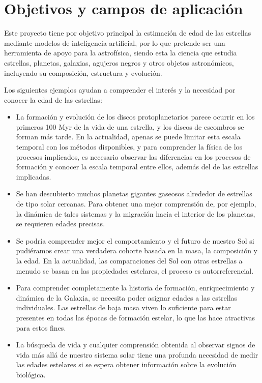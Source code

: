 \documentclass[12pt,oneside,a4paper]{article}
\begin{document}
\section{Objetivos y campos de aplicación}
Este proyecto tiene por objetivo principal la estimación de edad de las estrellas mediante modelos de inteligencia artificial, por lo que pretende ser una herramienta de apoyo para la astrofísica, siendo esta la ciencia que estudia estrellas, planetas, galaxias, agujeros negros y otros objetos astronómicos, incluyendo su composición, estructura y evolución.

Los siguientes ejemplos ayudan a comprender el interés y la necesidad por conocer la edad de las estrellas:
\begin{itemize}
\item La formación y evolución de los discos protoplanetarios parece ocurrir en los primeros 100 Myr de la vida de una estrella, y los discos de escombros se forman más tarde. En la actualidad, apenas se puede limitar esta escala temporal con los métodos disponibles, y para comprender la física de los procesos implicados, es necesario observar las diferencias en los procesos de formación y conocer la escala temporal entre ellos, además del de las estrellas implicadas.
\item Se han descubierto muchos planetas gigantes gaseosos alrededor de estrellas de tipo solar cercanas. Para obtener una mejor comprensión de, por ejemplo, la dinámica de tales sistemas y la migración hacia el interior de los planetas, se requieren edades precisas.
\item Se podría comprender mejor el comportamiento y el futuro de nuestro Sol si pudiéramos crear una verdadera cohorte basada en la masa, la composición y la edad. En la actualidad, las comparaciones del Sol con otras estrellas a menudo se basan en las propiedades estelares, el proceso es autorreferencial.
\item Para comprender completamente la historia de formación, enriquecimiento y dinámica de la Galaxia, se necesita poder asignar edades a las estrellas individuales. Las estrellas de baja masa viven lo suficiente para estar presentes en todas las épocas de formación estelar, lo que las hace atractivas para estos fines.
\item La búsqueda de vida y cualquier comprensión obtenida al observar signos de vida más allá de nuestro sistema solar tiene una profunda necesidad de medir las edades estelares si se espera obtener información sobre la evolución biológica.
\end{itemize}
\end{document}
